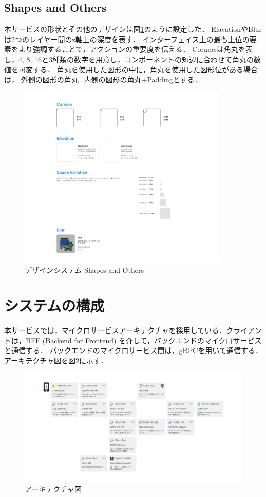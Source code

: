 \subsection{Shapes and Others}
    本サービスの形状とその他のデザインは図\ref{fig:shapes}のように設定した．
    ElavationやBlurは2つのレイヤー間のz軸上の深度を表す．
    インターフェイス上の最も上位の要素をより強調することで，アクションの重要度を伝える．
    Cornersは角丸を表し，4, 8, 16と3種類の数字を用意し，コンポーネントの短辺に合わせて角丸の数値を可変する．
    角丸を使用した図形の中に，角丸を使用した図形位がある場合は，
    外側の図形の角丸=内側の図形の角丸+Paddingとする．
    \begin{figure}
        \centering
        \includegraphics[width=10cm]{images/shapes.png}
        \caption{デザインシステム Shapes and Others}
        \label{fig:shapes}
    \end{figure}

\section{システムの構成}
本サービスでは，マイクロサービスアーキテクチャを採用している．クライアントは，BFF (Backend for Frontend) を介して，バックエンドのマイクロサービスと通信する．
バックエンドのマイクロサービス間は，gRPCを用いて通信する．アーキテクチャ図を図\ref{fig:architecture}に示す．
\begin{figure}
    \centering
    \includegraphics[width=14cm]{images/architecture_diagram.png}
    \caption{アーキテクチャ図}
    \label{fig:architecture}
\end{figure}

